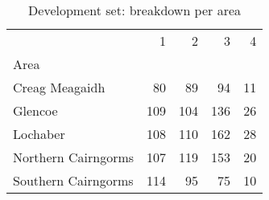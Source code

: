 \begin{table}[h]
\caption{Development set:  breakdown per area}
\label{tbl:sais_mapped_hazard_breakdown_per_area_dev}
\begin{tabular}{lrrrr}
\toprule
 & 1 & 2 & 3 & 4 \\
Area &  &  &  &  \\
\midrule
Creag Meagaidh & 80 & 89 & 94 & 11 \\
Glencoe & 109 & 104 & 136 & 26 \\
Lochaber & 108 & 110 & 162 & 28 \\
Northern Cairngorms & 107 & 119 & 153 & 20 \\
Southern Cairngorms & 114 & 95 & 75 & 10 \\
\bottomrule
\end{tabular}
\end{table}
